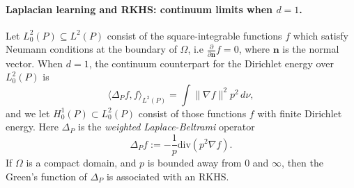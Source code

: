 \documentclass{article}
\newcommand{\1}{\mathbf{1}}
\newcommand{\Leb}{L}
\newcommand{\dive}{\mathrm{div}}
\newcommand{\dotp}[2]{\langle #1, #2 \rangle}
\theoremstyle{definition}
\theoremstyle{remark}
\begin{document}
\paragraph{Laplacian learning and RKHS: continuum limits when $d = 1$.}
Let $L_0^2(P) \subseteq \Leb^2(P)$ consist of the square-integrable functions $f$ which satisfy Neumann conditions at the boundary of $\Omega$, i.e $\frac{\partial}{\partial \mathbf{n}}f = 0$, where $\mathbf{n}$ is the normal vector. When $d = 1$, the continuum counterpart for the Dirichlet energy over $L_0^2(P)$ is
\begin{equation*}
\dotp{\Delta_{P}f}{f}_{\Leb^2(P)} = \int \|\nabla f\|^2 p^2 \,d\nu,
\end{equation*}
and we let $H_0^1(P) \subset L_0^2(P)$ consist of those functions $f$ with finite Dirichlet energy. Here $\Delta_P$ is the \emph{weighted Laplace-Beltrami} operator
\begin{equation*}
\Delta_Pf := -\frac{1}{p} \dive(p^2 \nabla f).
\end{equation*}
If $\Omega$ is a compact domain, and $p$ is bounded away from $0$ and $\infty$, then the Green's function of $\Delta_P$ is associated with an RKHS. 
\end{document}
